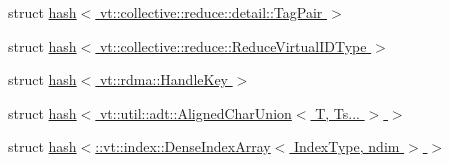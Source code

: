 \begin{DoxyCompactItemize}
\item 
struct \hyperlink{structstd_1_1hash_3_01vt_1_1collective_1_1reduce_1_1detail_1_1_tag_pair_01_4}{hash$<$ vt\+::collective\+::reduce\+::detail\+::\+Tag\+Pair $>$}
\item 
struct \hyperlink{structstd_1_1hash_3_01vt_1_1collective_1_1reduce_1_1_reduce_virtual_i_d_type_01_4}{hash$<$ vt\+::collective\+::reduce\+::\+Reduce\+Virtual\+I\+D\+Type $>$}
\item 
struct \hyperlink{structstd_1_1hash_3_01vt_1_1rdma_1_1_handle_key_01_4}{hash$<$ vt\+::rdma\+::\+Handle\+Key $>$}
\item 
struct \hyperlink{structstd_1_1hash_3_01vt_1_1util_1_1adt_1_1_aligned_char_union_3_01_t_00_01_ts_8_8_8_01_4_01_4}{hash$<$ vt\+::util\+::adt\+::\+Aligned\+Char\+Union$<$ T, Ts... $>$ $>$}
\item 
struct \hyperlink{structstd_1_1hash_3_1_1vt_1_1index_1_1_dense_index_array_3_01_index_type_00_01ndim_01_4_01_4}{hash$<$\+::vt\+::index\+::\+Dense\+Index\+Array$<$ Index\+Type, ndim $>$ $>$}
\end{DoxyCompactItemize}
